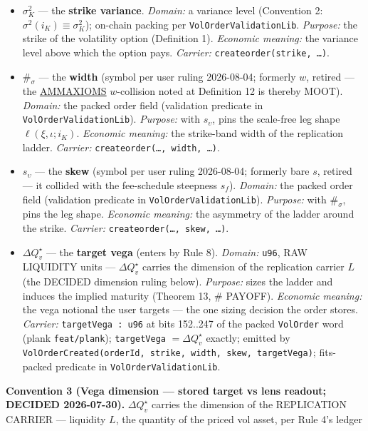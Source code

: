\documentclass[11pt]{article}
\renewcommand{\_}{\textunderscore\allowbreak}
\begin{document}
\begin{itemize}
\item
  \(\sigma^2_K\) --- the \textbf{strike variance}. \emph{Domain:} a variance level (Convention 2: \(\sigma^2(i_K) \equiv \sigma^2_K\)); on-chain packing per \texttt{VolOrderValidationLib}. \emph{Purpose:} the strike of the volatility option (Definition 1). \emph{Economic meaning:} the variance level above which the option pays. \emph{Carrier:} \texttt{create\_order(strike,\ …)}.
\item
  \(\#_{\sigma}\) --- the \textbf{width} (symbol per user ruling 2026-08-04; formerly \(w\), retired --- the \href{../refs/cfmm/bichuch_feinstein-axioms_for_amms-2022.pdf}{AMM\_AXIOMS} \(w\)-collision noted at Definition 12 is thereby MOOT). \emph{Domain:} the packed order field (validation predicate in \texttt{VolOrderValidationLib}). \emph{Purpose:} with \(s_{\upsilon}\), pins the scale-free leg shape \(\ell(\xi,\iota;i_K)\). \emph{Economic meaning:} the strike-band width of the replication ladder. \emph{Carrier:} \texttt{create\_order(…,\ width,\ …)}.
\item
  \(s_{\upsilon}\) --- the \textbf{skew} (symbol per user ruling 2026-08-04; formerly bare \(s\), retired --- it collided with the fee-schedule steepness \(s_f\)). \emph{Domain:} the packed order field (validation predicate in \texttt{VolOrderValidationLib}). \emph{Purpose:} with \(\#_{\sigma}\), pins the leg shape. \emph{Economic meaning:} the asymmetry of the ladder around the strike. \emph{Carrier:} \texttt{create\_order(…,\ skew,\ …)}.
\item
  \(\Delta Q_v^{\star}\) --- the \textbf{target vega} (enters by Rule 8). \emph{Domain:} \texttt{u96}, RAW LIQUIDITY units --- \(\Delta Q_v^{\star}\) carries the dimension of the replication carrier \(L\) (the DECIDED dimension ruling below). \emph{Purpose:} sizes the ladder and induces the implied maturity (Theorem 13, \# PAYOFF). \emph{Economic meaning:} the vega notional the user targets --- the one sizing decision the order stores. \emph{Carrier:} \texttt{targetVega\ :\ u96} at bits 152..247 of the packed \texttt{VolOrder} word (plank \texttt{feat/plank}); \texttt{targetVega} \(= \Delta Q_v^{\star}\) exactly; emitted by \texttt{VolOrderCreated(orderId,\ strike,\ width,\ skew,\ targetVega)}; fits-packed predicate in \texttt{VolOrderValidationLib}.
\end{itemize}

\textbf{Convention 3 (Vega dimension --- stored target vs lens readout; DECIDED 2026-07-30).} \(\Delta Q_v^{\star}\) carries the dimension of the REPLICATION CARRIER --- liquidity \(L\), the quantity of the priced vol asset, per Rule 4's ledger
\end{document}
